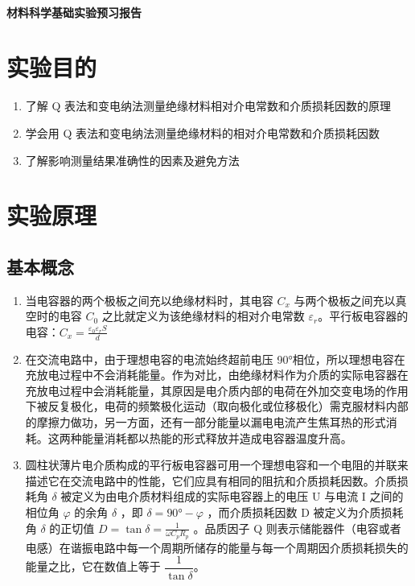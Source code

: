 \documentclass[a4paper,utf8]{article}
\begin{document}
\begin{center}
    {\mbox{}\\[7em]\bfseries\songti%
    材料科学基础实验预习报告}\\[34mm]
\end{center}
\newpage
\section{实验目的}
    \begin{enumerate}
        \item 了解 Q 表法和变电纳法测量绝缘材料相对介电常数和介质损耗因数的原理
        \item 学会用 Q 表法和变电纳法测量绝缘材料的相对介电常数和介质损耗因数
        \item 了解影响测量结果准确性的因素及避免方法
    \end{enumerate}
\section{实验原理}%
    \subsection{基本概念}
        \begin{enumerate}
            \item 当电容器的两个极板之间充以绝缘材料时，其电容 $C_x$ 与两个极板之间充以真空时的电容 $C_0$ 之比就定义为该绝缘材料的相对介电常数 $\varepsilon_r$。平行板电容器的电容：$C_x=\frac{\varepsilon_0 \varepsilon_r S}{d}$
            \item 在交流电路中，由于理想电容的电流始终超前电压 90°相位，所以理想电容在充放电过程中不会消耗能量。作为对比，由绝缘材料作为介质的实际电容器在充放电过程中会消耗能量，其原因是电介质内部的电荷在外加交变电场的作用下被反复极化，电荷的频繁极化运动（取向极化或位移极化）需克服材料内部的摩擦力做功，另一方面，还有一部分能量以漏电电流产生焦耳热的形式消耗。这两种能量消耗都以热能的形式释放并造成电容器温度升高。
            \item 圆柱状薄片电介质构成的平行板电容器可用一个理想电容和一个电阻的并联来描述它在交流电路中的性能，它们应具有相同的阻抗和介质损耗因数。介质损耗角 $\delta$ 被定义为由电介质材料组成的实际电容器上的电压 U 与电流 I 之间的相位角 $\varphi$ 的余角 $\delta$ ，即 $\delta  = 90\si{\degree} - \varphi$ ，而介质损耗因数 D 被定义为介质损耗角 $\delta$ 的正切值 $D=\tan\delta=\frac{1}{\omega C_{p}R_{p}}$ 。品质因子 Q 则表示储能器件（电容或者电感）在谐振电路中每一个周期所储存的能量与每一个周期因介质损耗损失的能量之比，它在数值上等于 $\dfrac{1}{\tan\delta}$。
        \end{enumerate}
        
\end{document}
